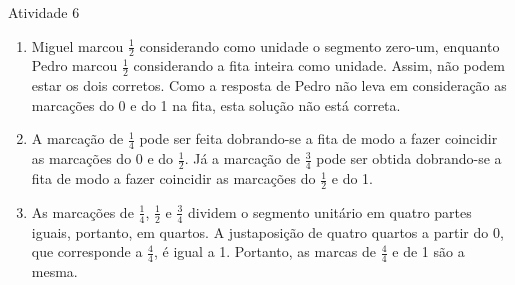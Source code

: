 \begin{multicols}{2}
\begin{resposta*}{Atividade 6}

\begin{enumerate} [\quad a)] %
    \item       Miguel marcou       $\frac{1}{2}$       considerando como unidade o segmento zero-um, enquanto Pedro marcou       $\frac{1}{2}$       considerando a fita inteira como unidade. Assim, não podem estar os dois corretos. Como a resposta de Pedro não leva em consideração as marcações do 0 e do 1 na fita, esta solução não está correta.
    
    \item       A marcação de       $\frac{1}{4}$       pode ser feita dobrando-se a fita de modo a fazer coincidir as marcações do 0 e do        $\frac{1}{2}$. Já a marcação de       $\frac{3}{4}$     pode ser obtida dobrando-se a fita de modo a fazer coincidir as marcações do       $\frac{1}{2}$       e do 1. 


    \item       As marcações de       $\frac{1}{4}$,        $\frac{1}{2}$       e       $\frac{3}{4}$       dividem o segmento unitário em quatro partes iguais, portanto, em quartos. A justaposição de quatro quartos a partir do 0, que corresponde a       $\frac{4}{4}$, é igual a 1.  Portanto, as marcas de       $\frac{4}{4}$       e de 1 são a mesma.
 
    

\end{enumerate}
\end{resposta*}
\end{multicols}
